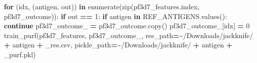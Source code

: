 \documentclass[
  11pt,
  oneside]{book}
\newenvironment{Shaded}{\begin{snugshade}}{\end{snugshade}}
\newcommand{\BuiltInTok}[1]{#1}
\newcommand{\ControlFlowTok}[1]{\textcolor[rgb]{0.13,0.29,0.53}{\textbf{#1}}}
\newcommand{\DecValTok}[1]{\textcolor[rgb]{0.00,0.00,0.81}{#1}}
\newcommand{\KeywordTok}[1]{\textcolor[rgb]{0.13,0.29,0.53}{\textbf{#1}}}
\newcommand{\NormalTok}[1]{#1}
\newcommand{\OperatorTok}[1]{\textcolor[rgb]{0.81,0.36,0.00}{\textbf{#1}}}
\newcommand{\StringTok}[1]{\textcolor[rgb]{0.31,0.60,0.02}{#1}}
\begin{document}
\begin{Shaded}
\begin{Highlighting}[]
\ControlFlowTok{for}\NormalTok{ (idx, (antigen, out)) }\KeywordTok{in} \BuiltInTok{enumerate}\NormalTok{(}\BuiltInTok{zip}\NormalTok{(pf3d7\_features.index, pf3d7\_outcome)):}
    \ControlFlowTok{if}\NormalTok{ out }\OperatorTok{==} \DecValTok{1}\NormalTok{:}
        \ControlFlowTok{if}\NormalTok{ antigen }\KeywordTok{in}\NormalTok{ REF\_ANTIGENS.values():}
            \ControlFlowTok{continue}
\NormalTok{        pf3d7\_outcome\_ }\OperatorTok{=}\NormalTok{ pf3d7\_outcome.copy()}
\NormalTok{        pf3d7\_outcome\_[idx] }\OperatorTok{=} \DecValTok{0}
\NormalTok{        train\_purf(pf3d7\_features, pf3d7\_outcome\_,}
\NormalTok{                   res\_path}\OperatorTok{=}\StringTok{\textquotesingle{}\textasciitilde{}/Downloads/jackknife/\textquotesingle{}} \OperatorTok{+}\NormalTok{ antigen }\OperatorTok{+} \StringTok{\textquotesingle{}\_res.csv\textquotesingle{}}\NormalTok{,}
\NormalTok{                   pickle\_path}\OperatorTok{=}\StringTok{\textquotesingle{}\textasciitilde{}/Downloads/jackknife/\textquotesingle{}} \OperatorTok{+}\NormalTok{ antigen }\OperatorTok{+} \StringTok{\textquotesingle{}\_purf.pkl\textquotesingle{}}\NormalTok{)}
\end{Highlighting}
\end{Shaded}
\end{document}

